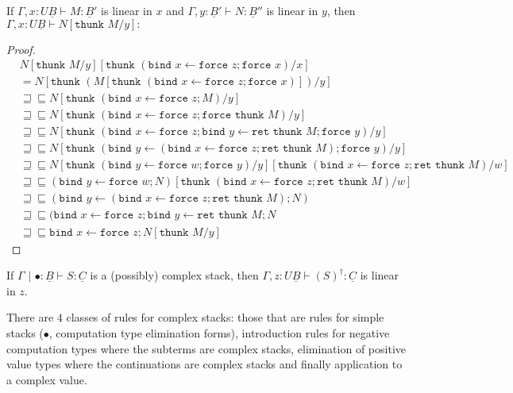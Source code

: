 \documentclass[acmsmall,nonacm]{acmart}
\renewcommand{\u}{\underline}
\newcommand{\pipe}{\,\,|\,\,}
\newcommand{\ltdyn}{\sqsubseteq}
\newcommand{\gtdyn}{\sqsupseteq}
\newcommand{\equidyn}{\mathrel{\gtdyn\ltdyn}}
\newcommand{\simp}[1]{{#1}^{\dag}}
\newcommand{\simpp}[1]{\simp{({#1})}}
\newcommand{\bindXtoYinZ}[2]{\kw{bind}#2 \leftarrow #1;}
\newcommand{\kw}[1]{\texttt{#1}\,\,}
\newcommand{\ret}{\kw{ret}}
\newcommand{\thunk}{\kw{thunk}}
\newcommand{\force}{\kw{force}}
\begin{document}
{\begin{longonly}
\begin{lemma}
  If $\Gamma , x : U \u B \vdash M : \u B'$ is linear in $x$ and
  $\Gamma , y : \u B' \vdash N : \u B''$ is linear in $y$, then
  $\Gamma , x : U \u B \vdash N[\thunk M/y] : $
\end{lemma}
\begin{proof}
  \begin{align*}
    &N[\thunk M/y][\thunk{(\bindXtoYinZ {\force z} x \force x)}/x]\\
    &= N[\thunk {(M[\thunk{(\bindXtoYinZ {\force z} x \force x)}])}/y]\\
    &\equidyn N[\thunk {(\bindXtoYinZ {\force z} x M)}/y]\tag{$M$ linear}\\
    &\equidyn N[\thunk{(\bindXtoYinZ {\force z} x \force \thunk M)}/y] \tag{$U\beta$}\\
    &\equidyn
    N[\thunk{(\bindXtoYinZ {\force z} x \bindXtoYinZ {\ret\thunk M} y \force y)}/y] \tag{$\u F\beta$}\\
    &\equidyn
    N[\thunk{(\bindXtoYinZ {(\bindXtoYinZ {\force z} x \ret\thunk M)} y \force y)}/y] \tag{$\u F\eta$}\\
    &\equidyn
    N[\thunk{(\bindXtoYinZ {\force w} y \force y)}/y][\thunk(\bindXtoYinZ {\force z} x \ret\thunk M)/w] \tag{$U\beta$}\\
    &\equidyn (\bindXtoYinZ {\force w} y N)[\thunk (\bindXtoYinZ {\force z} x \ret \thunk M)/w] \tag{$N$ linear}\\
    &\equidyn (\bindXtoYinZ {(\bindXtoYinZ {\force z} x \ret \thunk M)} y N) \tag{$U\beta$}\\
    &\equidyn (\bindXtoYinZ {\force z} x \bindXtoYinZ {\ret\thunk M} y N \tag{$\u F\eta$}\\
    &\equidyn \bindXtoYinZ {\force z} x N[\thunk M/y]
  \end{align*}
\end{proof}

\begin{lemma}
  If $\Gamma\pipe \bullet : \u B \vdash S : \u C$ is a (possibly)
  complex stack, then $\Gamma, z : U\u B \vdash \simpp{S} : \u C$ is linear in $z$.
\end{lemma}
\begin{longproof}
  There are $4$ classes of rules for complex stacks: those that are
  rules for simple stacks ($\bullet$, computation type elimination
  forms), introduction rules for negative computation types where the
  subterms are complex stacks, elimination of positive value types
  where the continuations are complex stacks and finally application
  to a complex value.


\end{longproof}
\end{longonly}}
\end{document}

